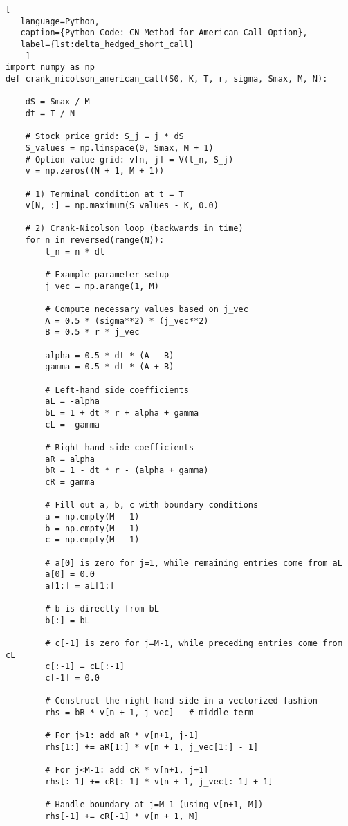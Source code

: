     \begin{lstlisting}[
   language=Python,
   caption={Python Code: CN Method for American Call Option},
   label={lst:delta_hedged_short_call}
    ]
import numpy as np
def crank_nicolson_american_call(S0, K, T, r, sigma, Smax, M, N):

    dS = Smax / M
    dt = T / N

    # Stock price grid: S_j = j * dS
    S_values = np.linspace(0, Smax, M + 1)
    # Option value grid: v[n, j] = V(t_n, S_j)
    v = np.zeros((N + 1, M + 1))

    # 1) Terminal condition at t = T
    v[N, :] = np.maximum(S_values - K, 0.0)

    # 2) Crank-Nicolson loop (backwards in time)
    for n in reversed(range(N)):
        t_n = n * dt

        # Example parameter setup
        j_vec = np.arange(1, M)

        # Compute necessary values based on j_vec
        A = 0.5 * (sigma**2) * (j_vec**2)
        B = 0.5 * r * j_vec

        alpha = 0.5 * dt * (A - B)
        gamma = 0.5 * dt * (A + B)

        # Left-hand side coefficients
        aL = -alpha
        bL = 1 + dt * r + alpha + gamma
        cL = -gamma

        # Right-hand side coefficients
        aR = alpha
        bR = 1 - dt * r - (alpha + gamma)
        cR = gamma

        # Fill out a, b, c with boundary conditions
        a = np.empty(M - 1)
        b = np.empty(M - 1)
        c = np.empty(M - 1)

        # a[0] is zero for j=1, while remaining entries come from aL
        a[0] = 0.0
        a[1:] = aL[1:]

        # b is directly from bL
        b[:] = bL

        # c[-1] is zero for j=M-1, while preceding entries come from cL
        c[:-1] = cL[:-1]
        c[-1] = 0.0

        # Construct the right-hand side in a vectorized fashion
        rhs = bR * v[n + 1, j_vec]   # middle term

        # For j>1: add aR * v[n+1, j-1]
        rhs[1:] += aR[1:] * v[n + 1, j_vec[1:] - 1]

        # For j<M-1: add cR * v[n+1, j+1]
        rhs[:-1] += cR[:-1] * v[n + 1, j_vec[:-1] + 1]

        # Handle boundary at j=M-1 (using v[n+1, M])
        rhs[-1] += cR[-1] * v[n + 1, M]


\end{lstlisting}
